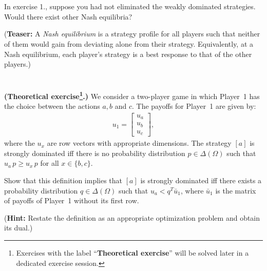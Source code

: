 \documentclass{../ape}
\begin{document}
\section{}
In exercise 1., suppose you had not eliminated the weakly dominated strategies. Would there exist other Nash equilibria?

(\textbf{Teaser:} A \emph{Nash equilibrium} is a strategy profile for all players such that neither of them would gain from deviating alone from their strategy. Equivalently, at a Nash equilibrium, each player's strategy is a best response to that of the other players.)


\section{}
\textbf{(Theoretical exercise\footnote{\footnotesize Exercises with the label ``\textbf{Theoretical exercise}'' will be solved later in a dedicated exercise session.}.)} We consider a two-player game in which Player~1 has the choice between the actions $a, b$ and $c$. The payoffs for Player~1 are given by:
\begin{align*}
	u_1 = \begin{bmatrix} u_a \\ u_b \\ u_c \end{bmatrix},
\end{align*} 
where the $u_x$ are row vectors with appropriate dimensions. The strategy $[a]$ is strongly dominated iff there is no probability distribution $p \in \Delta(\Omega)$ such that $u_a \, p \geq u_x \, p$ for all $x \in \{ b, c \}$.

Show that this definition implies that $[a]$ is strongly dominated iff there exists a probability distribution $q \in \Delta(\Omega)$ such that $u_a < q^T \bar{u}_1$, where $\bar{u}_1$ is the matrix of payoffs of Player~1 without its first row.

(\textbf{Hint:} Restate the definition as an appropriate optimization problem and obtain its dual.)
\end{document}
